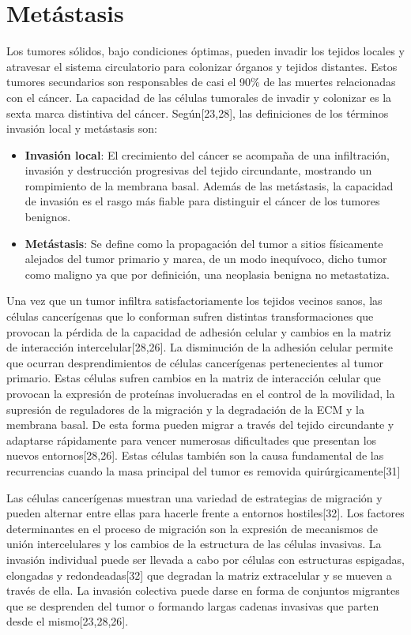 \section{Metástasis}
\hspace{.1cm}Los tumores sólidos, bajo condiciones óptimas, pueden invadir los tejidos locales y atravesar el sistema circulatorio para colonizar órganos y tejidos distantes. Estos tumores secundarios son responsables de casi el 90\% de las muertes relacionadas con el cáncer. La capacidad de las células tumorales de invadir y colonizar es la sexta marca distintiva del cáncer. Según[23,28], las definiciones de los términos invasión local y metástasis son:
\begin{itemize}
    \item \textbf{Invasión local}: El crecimiento del cáncer se acompaña de una infiltración, invasión y destrucción progresivas del tejido circundante, mostrando un rompimiento de la membrana basal. Además de las metástasis, la capacidad de invasión es el rasgo más fiable para distinguir el cáncer de los tumores benignos.
    \item \textbf{Metástasis}: Se define como la propagación del tumor a sitios físicamente alejados del tumor primario y marca, de un modo inequívoco, dicho tumor como maligno ya que por definición, una neoplasia benigna no metastatiza.
\end{itemize}

\hspace{.1cm}Una vez que un tumor infiltra satisfactoriamente los tejidos vecinos sanos, las células cancerígenas que lo conforman sufren distintas transformaciones que provocan la pérdida de la capacidad de adhesión celular y cambios en la matriz de interacción intercelular[28,26]. La disminución de la adhesión celular permite que ocurran desprendimientos de células cancerígenas pertenecientes al tumor primario. Estas células sufren cambios en la matriz de interacción celular que provocan la expresión de proteínas involucradas en el control de la movilidad, la supresión de reguladores de la migración y la degradación de la ECM y la membrana basal. De esta forma pueden migrar a través del tejido circundante y adaptarse rápidamente para vencer numerosas dificultades que presentan los nuevos entornos[28,26]. Estas células también son la causa fundamental de las recurrencias cuando la masa principal del tumor es removida quirúrgicamente[31]

\hspace{.1cm}Las células cancerígenas muestran una variedad de estrategias de migración y pueden alternar entre ellas para hacerle frente a entornos hostiles[32]. Los factores determinantes en el proceso de migración son la expresión de mecanismos de unión intercelulares y los cambios de la estructura de las células invasivas. La invasión individual puede ser llevada a cabo por células con estructuras espigadas, elongadas y redondeadas[32] que degradan la matriz extracelular y se mueven a través de ella. La invasión colectiva puede darse en forma de conjuntos migrantes que se desprenden del tumor o formando largas cadenas invasivas que parten desde el mismo[23,28,26].

